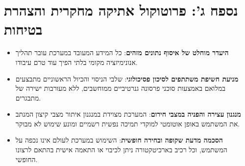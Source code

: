 \vspace{0.4cm}
\section*{נספח ג': פרוטוקול אתיקה מחקרית והצהרת בטיחות}
\label{app:ethics_protocol}

\begin{ethicsbox}
\begin{itemize}
    \item[$\checkmark$] \textbf{היעדר מוחלט של איסוף נתונים מזהים}: כל המידע המעובד במערכת עובר תהליך אנונימיזציה מקומי בלתי הפיך עוד טרם עיבודו.
    \item[$\checkmark$] \textbf{מניעת חשיפת משתתפים לסיכון פסיכולוגי}: שלבי הניסוי והכיול הראשוניים מתבצעים במלואם באמצעות סוכני פרסונה גנרטיביים ממוחשבים, ללא מעורבות ישירה של מתבגרים.
    \item[$\checkmark$] \textbf{מנגנון עצירה והפניה במצבי חירום}: המערכת מצוידת במנגנון איתור מצבי קיצון המנתב את המשתמש באופן אוטומטי למוקדי תמיכה נפשית רשמיים ומונע שימוש לא מבוקר.
    \item[$\checkmark$] \textbf{הסכמה מדעת שקופה ובחירה חופשית}: השימוש במערכת לעולם אינו נכפה על המשתמש, וכל רכיב בארכיטקטורה ניתן לכיבוי או התאמה אישית בהתאם לרצונו החופשי.
\end{itemize}
\end{ethicsbox}
